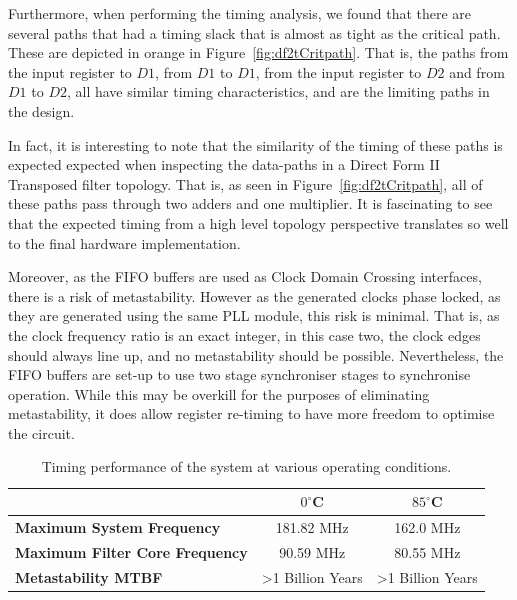\documentclass[]{article}
\begin{document}
Furthermore, when performing the timing analysis, we found that there are several paths that had a timing slack that is almost as tight as the critical path. These are depicted in orange in Figure~\ref{fig:df2tCritpath}.
That is, the paths from the input register to $D1$, from $D1$ to $D1$, from the input register to $D2$ and from $D1$ to $D2$, all have similar timing characteristics, and are the limiting paths in the design.

In fact, it is interesting to note that the similarity of the timing of these paths is expected expected when inspecting the data-paths in a Direct Form II Transposed filter topology. That is, as seen in Figure~\ref{fig:df2tCritpath}, all of these paths pass through two adders and one multiplier.
It is fascinating to see that the expected timing from a high level topology perspective translates so well to the final hardware implementation.

Moreover, as the FIFO buffers are used as Clock Domain Crossing interfaces, there is a risk of metastability. However as the generated clocks phase locked, as they are generated using the same PLL module, this risk is minimal.
That is, as the clock frequency ratio is an exact integer, in this case two, the clock edges should always line up, and no metastability should be possible.
Nevertheless, the FIFO buffers are set-up to use two stage synchroniser stages to synchronise operation. While this may be overkill for the purposes of eliminating metastability, it does allow register re-timing to have more freedom to optimise the circuit.  

\begin{table}[tbp]
	\caption{Timing performance of the system at various operating conditions.}
	\label{tab:fmax}
	\begin{center}
		\begin{tabular}{l|cc}
		\hline

		\hline
			 										& $0^\circ$C 					& $85^\circ$C 	\\
		\hline
			\textbf{Maximum System Frequency} 		& 181.82 MHz					& 162.0 MHz 	\\
		\hline
			\textbf{Maximum Filter Core Frequency}	& 90.59 MHz						& 80.55 MHz 	\\
		\hline
			\textbf{Metastability MTBF}				& \textgreater 1 Billion Years	& \textgreater 1 Billion Years \\
		\hline

		\hline
		\end{tabular}
	\end{center}
\end{table}
\end{document}
